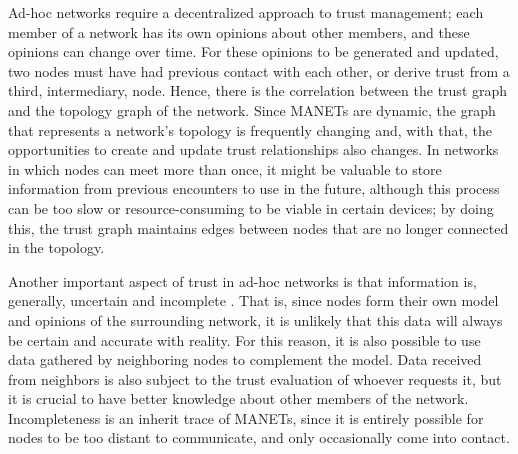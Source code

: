 Ad-hoc networks require a decentralized approach to trust management; each member of a network has its own opinions about other members, and these opinions can change over time.
For these opinions to be generated and updated, two nodes must have had previous contact with each other, or derive trust from a third, intermediary, node.
Hence, there is the correlation between the trust graph and the topology graph of the network.
Since MANETs are dynamic, the graph that represents a network's topology is frequently changing and, with that, the opportunities to create and update trust relationships also changes.
In networks in which nodes can meet more than once, it might be valuable to store information from previous encounters to use in the future, although this process can be too slow or resource-consuming to be viable in certain devices; by doing this, the trust graph maintains edges between nodes that are no longer connected in the topology.













Another important aspect of trust in ad-hoc networks is that information is, generally, uncertain and incomplete \citep{baras2005cooperation}.
That is, since nodes form their own model and opinions of the surrounding network, it is unlikely that this data will always be certain and accurate with reality.
For this reason, it is also possible to use data gathered by neighboring nodes to complement the model.
Data received from neighbors is also subject to the trust evaluation of whoever requests it, but it is crucial to have better knowledge about other members of the network.
Incompleteness is an inherit trace of MANETs, since it is entirely possible for nodes to be too distant to communicate, and only occasionally come into contact.

